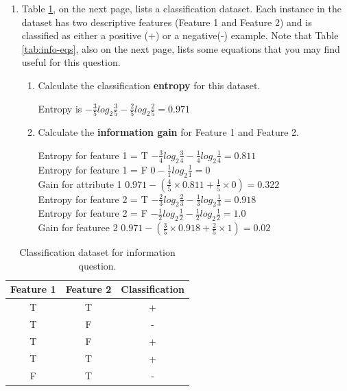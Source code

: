 \documentclass[solution]{ditpaper}
\begin{document}
\begin{enumerate}
		\item Table \ref{tab:classification-data}, on the next page, lists a classification dataset. Each instance in the dataset has two descriptive features (Feature 1 and Feature 2) and is classified as either a positive (+) or a negative(-) example. Note that Table \ref{tab:info-eqs}, also on the next page, lists some equations that you may find useful for this question.		
				\begin{enumerate}
			\item Calculate the classification \textbf{entropy} for this dataset.
			\begin{answer}
				Entropy is $-\frac{3}{5}log_2\frac{3}{5}-\frac{2}{5}log_2\frac{2}{5}=0.971$
			\end{answer}
			\item Calculate the \textbf{information gain} for Feature 1 and Feature 2.
			\begin{answer}
				Entropy for feature 1 = T $-\frac{3}{4}log_2\frac{3}{4}-\frac{1}{4}log_2\frac{1}{4}=0.811$\\
				Entropy for feature 1 = F $0-\frac{1}{1}log_2\frac{1}{1}=0$\\
				Gain for attribute 1 $0.971-(\frac{4}{5}\times0.811+\frac{1}{5}\times0)=0.322$\\
				Entropy for feature 2 = T $-\frac{2}{3}log_2\frac{2}{3}-\frac{1}{3}log_2\frac{1}{3}=0.918$\\
				Entropy for feature 2 = F $-\frac{1}{2}log_2\frac{1}{2}-\frac{1}{2}log_2\frac{1}{2}=1.0$\\
				Gain for featuree 2 $0.971-(\frac{3}{5}\times0.918+\frac{2}{5}\times1)=0.02$\\
			\end{answer}
		\end{enumerate}
	\end{enumerate}

\newpage

			\begin{table}[htb]
			\begin{center}
			\begin{tabular}{|c|c|c|}
				Feature 1 & Feature 2 & Classification \\
				\hline
				T & T & + \\
				T & F & - \\
				T & F & + \\
				T & T & + \\
				F & T & - \\
			\end{tabular}
			\end{center}
			\caption{Classification dataset for information question.}
			\label{tab:classification-data}
		\end{table}
\end{document}
